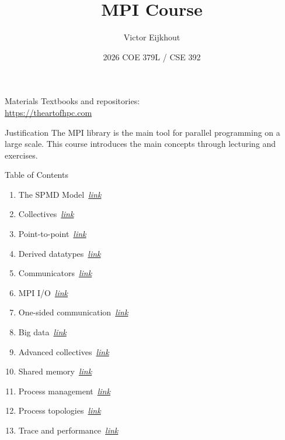 \documentclass[10pt]{beamer}
\begin{document}
\author[Eijkhout]{Victor Eijkhout}
\date[2026]{2026 COE 379L / CSE 392}
\title[MPI]{MPI Course}
\maketitle

\begin{frame}[containsverbatim]{Materials}
    Textbooks and repositories:\\
    \url{https://theartofhpc.com}
\end{frame}

\begin{frame}{Justification}
  The MPI library is the main tool
  for parallel programming on a large scale.
  This course introduces the main concepts
  through lecturing and exercises.
\end{frame}

\begin{frame}{Table of Contents}
  \begin{enumerate}
  \item The SPMD Model~\hyperlink{sec:spmd}{\textsl{link}}
  \item Collectives~\hyperlink{sec:collectives}{\textsl{link}}
  \item Point-to-point~\hyperlink{sec:ptp}{\textsl{link}}
  \item Derived datatypes~\hyperlink{sec:derived}{\textsl{link}}
  \item Communicators~\hyperlink{sec:comm}{\textsl{link}}
  \item MPI I/O~\hyperlink{sec:io}{\textsl{link}}
  \item One-sided communication~\hyperlink{sec:1side}{\textsl{link}}
  \item Big data~\hyperlink{sec:bigdata}{\textsl{link}}
  \item Advanced collectives~\hyperlink{sec:coll2}{\textsl{link}}
  \item Shared memory~\hyperlink{sec:shared}{\textsl{link}}
  \item Process management~\hyperlink{sec:process}{\textsl{link}}
  \item Process topologies~\hyperlink{sec:topo}{\textsl{link}}
  \item Trace and performance~\hyperlink{sec:trace}{\textsl{link}}
  \end{enumerate}
\end{frame}

\end{document}
